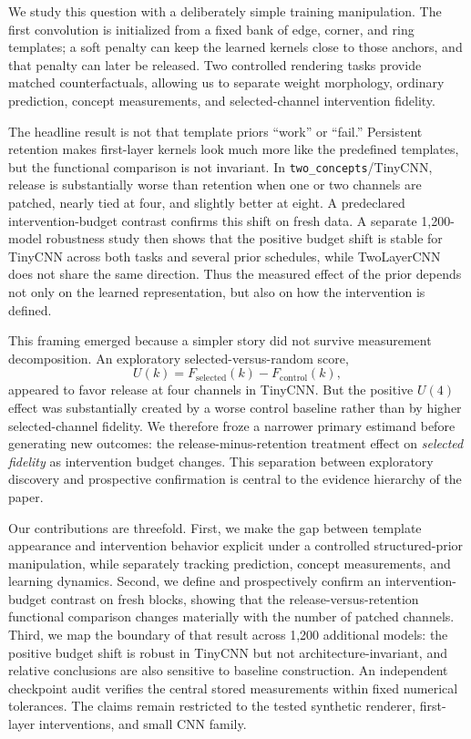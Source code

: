 \documentclass[10pt]{article}
\begin{document}
We study this question with a deliberately simple training manipulation. The first convolution is initialized from a fixed bank of edge, corner, and ring templates; a soft penalty can keep the learned kernels close to those anchors, and that penalty can later be released. Two controlled rendering tasks provide matched counterfactuals, allowing us to separate weight morphology, ordinary prediction, concept measurements, and selected-channel intervention fidelity.

The headline result is not that template priors ``work'' or ``fail.'' Persistent retention makes first-layer kernels look much more like the predefined templates, but the functional comparison is not invariant. In \texttt{two\_concepts}/TinyCNN, release is substantially worse than retention when one or two channels are patched, nearly tied at four, and slightly better at eight. A predeclared intervention-budget contrast confirms this shift on fresh data. A separate 1,200-model robustness study then shows that the positive budget shift is stable for TinyCNN across both tasks and several prior schedules, while TwoLayerCNN does not share the same direction. Thus the measured effect of the prior depends not only on the learned representation, but also on how the intervention is defined.

This framing emerged because a simpler story did not survive measurement decomposition. An exploratory selected-versus-random score,
\[
U(k)=F_{\mathrm{selected}}(k)-F_{\mathrm{control}}(k),
\]
appeared to favor release at four channels in TinyCNN. But the positive $U(4)$ effect was substantially created by a worse control baseline rather than by higher selected-channel fidelity. We therefore froze a narrower primary estimand before generating new outcomes: the release-minus-retention treatment effect on \emph{selected fidelity} as intervention budget changes. This separation between exploratory discovery and prospective confirmation is central to the evidence hierarchy of the paper.

Our contributions are threefold. First, we make the gap between template appearance and intervention behavior explicit under a controlled structured-prior manipulation, while separately tracking prediction, concept measurements, and learning dynamics. Second, we define and prospectively confirm an intervention-budget contrast on fresh blocks, showing that the release-versus-retention functional comparison changes materially with the number of patched channels. Third, we map the boundary of that result across 1,200 additional models: the positive budget shift is robust in TinyCNN but not architecture-invariant, and relative conclusions are also sensitive to baseline construction. An independent checkpoint audit verifies the central stored measurements within fixed numerical tolerances. The claims remain restricted to the tested synthetic renderer, first-layer interventions, and small CNN family.
\end{document}
